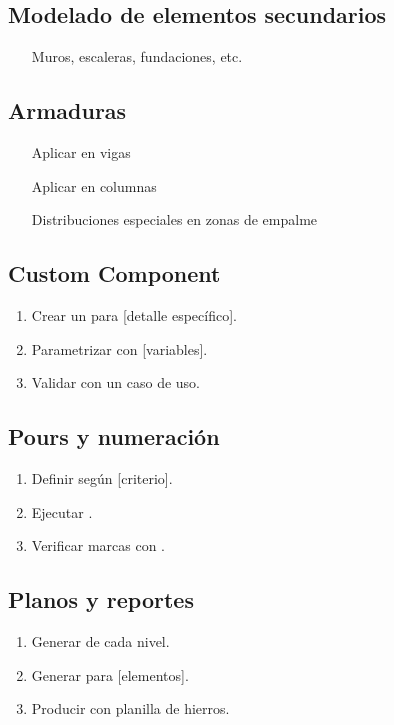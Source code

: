 \documentclass[11pt,a4paper]{article}
\begin{document}
\subsection{Modelado de elementos secundarios}
\begin{enumerate}
    \item [Muros, escaleras, fundaciones, etc.]
\end{enumerate}

\subsection{Armaduras}
\begin{enumerate}
    \item [Aplicar \tk{Rebar Set} en vigas]
    \item [Aplicar \tk{Rebar Set} en columnas]
    \item [Distribuciones especiales en zonas de empalme]
\end{enumerate}

\begin{comando}
\end{comando}

\subsection{Custom Component}
\begin{enumerate}
    \item Crear un  para [detalle específico].
    \item Parametrizar con [variables].
    \item Validar con un caso de uso.
\end{enumerate}

\subsection{Pours y numeración}
\begin{enumerate}
    \item Definir  según [criterio].
    \item Ejecutar .
    \item Verificar marcas con .
\end{enumerate}

\subsection{Planos y reportes}
\begin{enumerate}
    \item Generar  de cada nivel.
    \item Generar  para [elementos].
    \item Producir  con planilla de hierros.
\end{enumerate}
\end{document}
